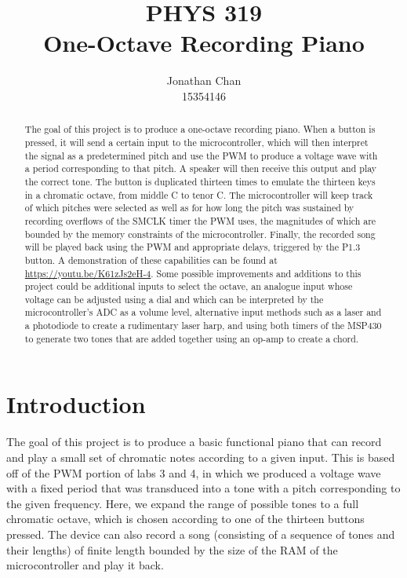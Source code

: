 \documentclass[letterpaper]{report}
\author{Jonathan Chan\\15354146}
\title{PHYS 319\\One-Octave Recording Piano}
\begin{document}
	\maketitle
	
	\begin{abstract}
		The goal of this project is to produce a one-octave recording piano. When a button is pressed, it will send a certain input to the microcontroller, which will then interpret the signal as a predetermined pitch and use the PWM to produce a voltage wave with a period corresponding to that pitch. A speaker will then receive this output and play the correct tone. The button is duplicated thirteen times to emulate the thirteen keys in a chromatic octave, from middle C to tenor C. The microcontroller will keep track of which pitches were selected as well as for how long the pitch was sustained by recording overflows of the SMCLK timer the PWM uses, the magnitudes of which are bounded by the memory constraints of the microcontroller. Finally, the recorded song will be played back using the PWM and appropriate delays, triggered by the P1.3 button. A demonstration of these capabilities can be found at \url{https://youtu.be/K61zJs2eH-4}. Some possible improvements and additions to this project could be additional inputs to select the octave, an analogue input whose voltage can be adjusted using a dial and which can be interpreted by the microcontroller's ADC as a volume level, alternative input methods such as a laser and a photodiode to create a rudimentary laser harp, and using both timers of the MSP430 to generate two tones that are added together using an op-amp to create a chord. 
	\end{abstract}

	\chapter{Introduction}
	The goal of this project is to produce a basic functional piano that can record and play a small set of chromatic notes according to a given input. This is based off of the PWM portion of labs 3 and 4, in which we produced a voltage wave with a fixed period that was transduced into a tone with a pitch corresponding to the given frequency. Here, we expand the range of possible tones to a full chromatic octave, which is chosen according to one of the thirteen buttons pressed. The device can also record a song (consisting of a sequence of tones and their lengths) of finite length bounded by the size of the RAM of the microcontroller and play it back.
	
\end{document}
